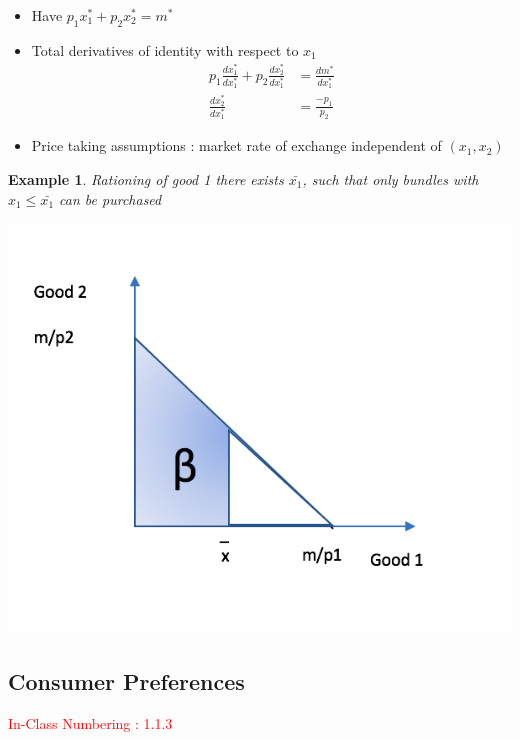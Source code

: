 \documentclass[twoside]{article}
\newtheorem{ex}[theorem]{Example}
\begin{document}
\begin{itemize}
\item Have \(p_1x_1^* + p_2x_2^* = m^*\) 
\item Total derivatives of identity with respect to \(x_1\)
\[\begin{aligned}
p_1 \frac{dx_1^*}{dx_1^*} + p_2 \frac{dx_2^*}{dx_1^*} & = \frac{dm^*}{dx_1^*} \\
\frac{dx_2^*}{dx_1^*} & = \frac{-p_1}{p_2} 
\end{aligned}\]
\end{itemize}

\begin{itemize}
\item Price taking assumptions : market rate of exchange independent of \((x_1, x_2)\) 
\end{itemize}
\begin{ex} Rationing of good 1 there exists \(\bar{x_1}\), such that only bundles with \(x_1 \leq \bar{x_1}\) can be purchased

\end{ex}


\begin{center}
\includegraphics[scale=0.6]{3}
\end{center}

\subsection{Consumer Preferences}
\textcolor{red}{In-Class Numbering : 1.1.3}
\end{document}

